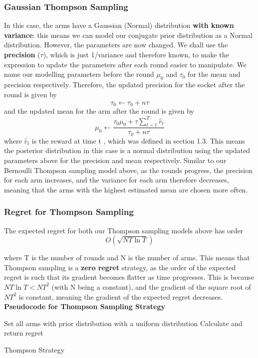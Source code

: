 \subsubsection{Gaussian Thompson Sampling}
In this case, the arms have a Gaussian (Normal) distribution \textbf{with known variance}: this means we can model our conjugate prior distribution as a Normal distribution. However, the parameters are now changed. We shall use the \textbf{precision} ($\tau$), which is just 1/variance and therefore known, to make the expression to update the parameters after each round easier to manipulate. We name our modelling parameters before the round $\mu_0$ and $\tau_0$ for the mean and precision respectively. Therefore, the updated precision for the socket after the round is given by
$$\tau_0\xleftarrow{}\tau_0 + n\tau$$
and the updated mean for the arm after the round is given by
$$\mu_0\xleftarrow{}\frac{\tau_0\mu_0 + \tau\sum_{t=1}^T\widehat{r}_t}{\tau_0 + n\tau} $$
where $\widehat{r}_t$ is the reward at time t \citep{agrawal2013further}, which was defined in section 1.3. This means the posterior distribution in this case is a normal distribution using the updated parameters above for the precision and mean respectively. Similar to our Bernoulli Thompson sampling model above, as the rounds progress, the precision for each arm increases, and the variance for each arm therefore decreases, meaning that the arms with the highest estimated mean are chosen more often.

\subsubsection{Regret for Thompson Sampling}
The expected regret for both our Thompson sampling models above has order
$$O(\sqrt{NT\ln{T}})$$

where T is the number of rounds and N is the number of arms. \citep{agrawal2013further} This means that Thompson sampling is a \textbf{zero regret} strategy, as the order of the expected regret is such that its gradient becomes flatter as time progresses. This is because $NT\ln{T} < NT^2$ (with N being a constant), and the gradient of the square root of $NT^2$ is constant, meaning the gradient of the expected regret decreases.
\newline
\textbf{Pseudocode for Thompson Sampling Strategy}
\newline
\begin{algorithm}[H]
    Set all arms with prior distribution with a uniform distribution\;
    Calculate and return regret
    \caption{Thompson Strategy}
\end{algorithm}